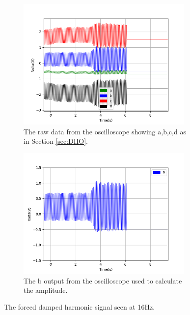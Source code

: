 \begin{figure}[h!]
\centering
\begin{subfigure}[t]{.475\textwidth}
  \centering
  \includegraphics[width=0.95\textwidth, height=0.20\textheight]{figures/FDHO/scope_42raw.png}
  \caption{The raw data from the oscilloscope showing a,b,c,d as in Section \ref{sec:DHO}.}
 \label{fig:FDHO_16Hz_raw}
\end{subfigure}\hfill
\begin{subfigure}[t]{.475\textwidth}
  \centering
  \includegraphics[width=0.95\textwidth, height=0.20\textheight]{figures/FDHO/scope_42v_2.png}
  \caption{The b output from the oscilloscope used to calculate the amplitude.}
\label{fig:FDHO_16Hz_b}
\end{subfigure}
\caption{The forced damped harmonic signal seen at 16Hz.}
\label{fig:FDHO_16Hz}
\end{figure}


